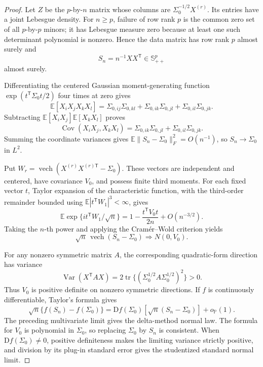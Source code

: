 \documentclass{article}
\begin{document}
\begin{proof}
Let \(Z\) be the \(p\)-by-\(n\) matrix whose columns are \(\Sigma_0^{-1/2}X^{(r)}\). Its entries have a joint Lebesgue density. For \(n\geq p\), failure of row rank \(p\) is the common zero set of all \(p\)-by-\(p\) minors; it has Lebesgue measure zero because at least one such determinant polynomial is nonzero. Hence the data matrix has row rank \(p\) almost surely and
\[
 S_n=n^{-1}XX^{\mathsf T}\in\mathbb S^p_{++}
\]
almost surely.

Differentiating the centered Gaussian moment-generating function \(\exp(t^{\mathsf T}\Sigma_0t/2)\) four times at zero gives
\[
 \mathbb E[X_iX_jX_kX_l]
 =\Sigma_{0,ij}\Sigma_{0,kl}
  +\Sigma_{0,ik}\Sigma_{0,jl}
  +\Sigma_{0,il}\Sigma_{0,jk}.
\]
Subtracting \(\mathbb E[X_iX_j]\mathbb E[X_kX_l]\) proves
\[
 \operatorname{Cov}(X_iX_j,X_kX_l)
 =\Sigma_{0,ik}\Sigma_{0,jl}+\Sigma_{0,il}\Sigma_{0,jk}.
\]
Summing the coordinate variances gives \(\mathbb E\|S_n-\Sigma_0\|_F^2=O(n^{-1})\), so \(S_n\to\Sigma_0\) in \(L^2\).

Put \(W_r=\operatorname{vech}(X^{(r)}X^{(r)\mathsf T}-\Sigma_0)\). These vectors are independent and centered, have covariance \(V_0\), and possess finite third moments. For each fixed vector \(t\), Taylor expansion of the characteristic function, with the third-order remainder bounded using \(\mathbb E|t^{\mathsf T}W_1|^3<\infty\), gives
\[
 \mathbb E\exp\{it^{\mathsf T}W_1/\sqrt n\}
 =1-\frac{t^{\mathsf T}V_0t}{2n}+O(n^{-3/2}).
\]
Taking the \(n\)-th power and applying the Cram\'er--Wold criterion yields
\[
 \sqrt n\,\operatorname{vech}(S_n-\Sigma_0)\Longrightarrow N(0,V_0).
\]

For any nonzero symmetric matrix \(A\), the corresponding quadratic-form direction has variance
\[
 \operatorname{Var}(X^{\mathsf T}AX)
 =2\operatorname{tr}\{(\Sigma_0^{1/2}A\Sigma_0^{1/2})^2\}>0.
\]
Thus \(V_0\) is positive definite on nonzero symmetric directions. If \(f\) is continuously differentiable, Taylor's formula gives
\[
 \sqrt n\{f(S_n)-f(\Sigma_0)\}
 =\mathrm Df(\Sigma_0)[\sqrt n(S_n-\Sigma_0)]+o_{\mathbb P}(1).
\]
The preceding multivariate limit gives the delta-method normal law. The formula for \(V_0\) is polynomial in \(\Sigma_0\), so replacing \(\Sigma_0\) by \(S_n\) is consistent. When \(\mathrm Df(\Sigma_0)\neq0\), positive definiteness makes the limiting variance strictly positive, and division by its plug-in standard error gives the studentized standard normal limit.
\end{proof}
\end{document}
